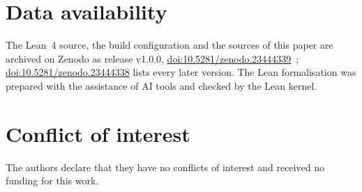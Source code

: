 \documentclass[aps,prd,twocolumn,superscriptaddress,nofootinbib,floatfix]{revtex4-2}
\theoremstyle{definition}
\theoremstyle{remark}
\begin{document}
\section*{Data availability}

The Lean~4 source, the build configuration and the sources of this paper
are archived on Zenodo as release v1.0.0,
\href{https://doi.org/10.5281/zenodo.23444339}{doi:10.5281/zenodo.23444339}~\cite{Repo};
\href{https://doi.org/10.5281/zenodo.23444338}{doi:10.5281/zenodo.23444338}
lists every later version. The Lean formalisation was prepared with
the assistance of AI tools and checked by the Lean kernel.

\section*{Conflict of interest}

The authors declare that they have no conflicts of interest and received
no funding for this work.
\end{document}

